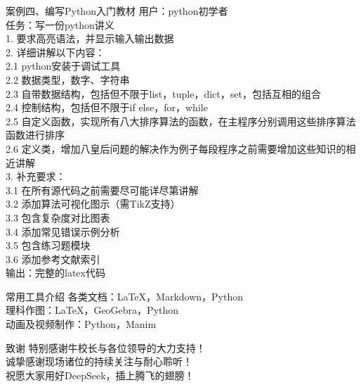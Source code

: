 \documentclass[aspectratio=169]{beamer}
\begin{document}
\begin{frame}[t]{案例四、编写Python入门教材}
\fontsize{9pt}{11pt}\selectfont
\alert{用户：python初学者}\\
\alert{任务：写一份python讲义}\\
1. 要求高亮语法，并显示输入输出数据\\
2. 详细讲解以下内容：\\
2.1 python安装于调试工具\\
2.2 数据类型，数字、字符串\\
2.3 自带数据结构，包括但不限于list，tuple，dict，set，包括互相的组合\\
2.4 控制结构，包括但不限于if else，for，while\\
2.5 自定义函数，实现所有八大排序算法的函数，在主程序分别调用这些排序算法函数进行排序\\
2.6 定义类，增加八皇后问题的解决作为例子每段程序之前需要增加这些知识的相近讲解\\
3. 补充要求：\\
3.1 在所有源代码之前需要尽可能详尽第讲解\\
3.2 添加算法可视化图示（需TikZ支持）\\
3.3 包含复杂度对比图表\\
3.4 添加常见错误示例分析\\
3.5 包含练习题模块\\
3.6 添加参考文献索引\\
\alert{输出：完整的latex代码}
\end{frame}

\begin{frame}[t]{常用工具介绍}
\fontsize{14pt}{18pt}\selectfont
各类文档：LaTeX，Markdown，Python \\
理科作图：LaTeX，GeoGebra，Python \\
动画及视频制作：Python，Manim \\
\end{frame}

\begin{frame}[t]{致谢}
\centering
\fontsize{14pt}{18pt}\selectfont
\vspace*{1.6cm}
特别感谢牛校长与各位领导的大力支持！\\
\vspace*{0.4cm}
诚挚感谢现场诸位的持续关注与耐心聆听！\\
\vspace*{0.4cm}
祝愿大家用好DeepSeek，插上腾飞的翅膀！
\end{frame}
\end{document}
